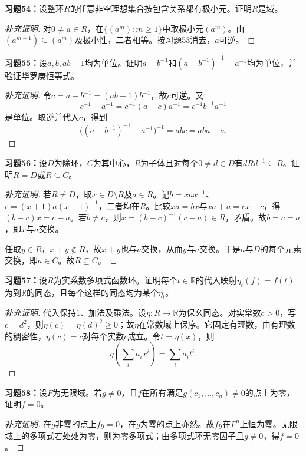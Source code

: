 \begin{problem}
\textbf{习题54：}设整环$R$的任意非空理想集合按包含关系都有极小元。证明$R$是域。
\end{problem}
\begin{proof}[补充证明]
对$0\ne a\in R$，在$\{(a^m):m\geqslant1\}$中取极小元$(a^m)$。由$(a^{m+1})\subseteq(a^m)$及极小性，二者相等。按习题53消去，$a$可逆。
\end{proof}

\begin{problem}
\textbf{习题55：}设$a,b,ab-1$均为单位。证明$a-b^{-1}$和$(a-b^{-1})^{-1}-a^{-1}$均为单位，并验证华罗庚恒等式。
\end{problem}
\begin{proof}[补充证明]
令$c=a-b^{-1}=(ab-1)b^{-1}$，故$c$可逆。又
\[
c^{-1}-a^{-1}=c^{-1}(a-c)a^{-1}=c^{-1}b^{-1}a^{-1}
\]
是单位。取逆并代入$c$，得到
\[
\bigl((a-b^{-1})^{-1}-a^{-1}\bigr)^{-1}=abc=aba-a.
\]
\end{proof}

\begin{problem}
\textbf{习题56：}设$D$为除环，$C$为其中心，$R$为子体且对每个$0\ne d\in D$有$dRd^{-1}\subseteq R$。证明$R=D$或$R\subseteq C$。
\end{problem}
\begin{proof}[补充证明]
若$R\ne D$，取$x\in D\setminus R$及$a\in R$。记$b=xax^{-1}$、$c=(x+1)a(x+1)^{-1}$，二者均在$R$。比较$xa=bx$与$xa+a=cx+c$，得$(b-c)x=c-a$。若$b\ne c$，则$x=(b-c)^{-1}(c-a)\in R$，矛盾。故$b=c=a$，即$x$与$a$交换。

任取$y\in R$，$x+y\notin R$，故$x+y$也与$a$交换，从而$y$与$a$交换。于是$a$与$D$的每个元素交换，即$a\in C$。故$R\subseteq C$。
\end{proof}

\begin{problem}
\textbf{习题57：}设$R$为实系数多项式函数环。证明每个$t\in\mathbb R$的代入映射$\eta_t(f)=f(t)$为到$\mathbb R$的同态，且每个这样的同态均为某个$\eta_t$。
\end{problem}
\begin{proof}[补充证明]
代入保持$1$、加法及乘法。设$\eta:R\to\mathbb R$为保幺同态。对实常数$c>0$，写$c=d^2$，则$\eta(c)=\eta(d)^2\geqslant0$；故$\eta$在常数域上保序。它固定有理数，由有理数的稠密性，$\eta(c)=c$对每个实数$c$成立。令$t=\eta(x)$，则
\[
\eta\left(\sum_i a_ix^i\right)=\sum_i a_it^i.
\]
\end{proof}

\begin{problem}
\textbf{习题58：}设$F$为无限域。若$g\ne0$，且$f$在所有满足$g(c_1,\ldots,c_n)\ne0$的点上为零，证明$f=0$。
\end{problem}
\begin{proof}[补充证明]
在$g$非零的点上$fg=0$，在$g$为零的点上亦然。故$fg$在$F^n$上恒为零。无限域上的多项式若处处为零，则为零多项式；由多项式环无零因子且$g\ne0$，得$f=0$。
\end{proof}

